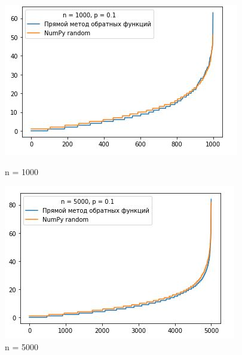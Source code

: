 \documentclass[a4paper,12pt, oneside]{book}
\begin{document}
{{\begin{figure}[h]
	\begin{center}
		\begin{minipage}[h]{0.4\linewidth}
			\includegraphics[width=1\linewidth]{py_3_1000.jpg}
			\caption{n = 1000} %
			\label{ris:experimoriginal} %
		\end{minipage}
		\hfill
		\begin{minipage}[h]{0.4\linewidth}
			\includegraphics[width=1\linewidth]{py_3_5000.jpg}
			\caption{n = 5000}
			\label{ris:experimcoded}
		\end{minipage}
	\end{center}
\end{figure} 


}}
\end{document}

